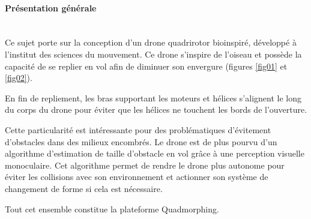 

\paragraph{Présentation générale} ~\ \\

Ce sujet porte sur la conception d'un drone quadrirotor bio­inspiré, développé à l'institut des sciences du mouvement. Ce drone s'inspire de l'oiseau et possède la capacité de se replier en vol afin de diminuer son envergure (figures \ref{fig01} et \ref{fig02}).

En fin de repliement, les bras supportant les moteurs et hélices s'alignent le long du corps du drone pour éviter que les hélices ne touchent les bords de l'ouverture.

Cette particularité est intéressante pour des problématiques d'évitement d'obstacles dans des milieux encombrés. Le drone est de plus pourvu d'un algorithme d'estimation de taille d'obstacle en vol grâce à une perception visuelle monoculaire. Cet algorithme permet de rendre le drone plus autonome pour éviter les collisions avec son environnement et actionner son système de changement de forme si cela est nécessaire.

Tout cet ensemble constitue la plateforme Quadmorphing.

